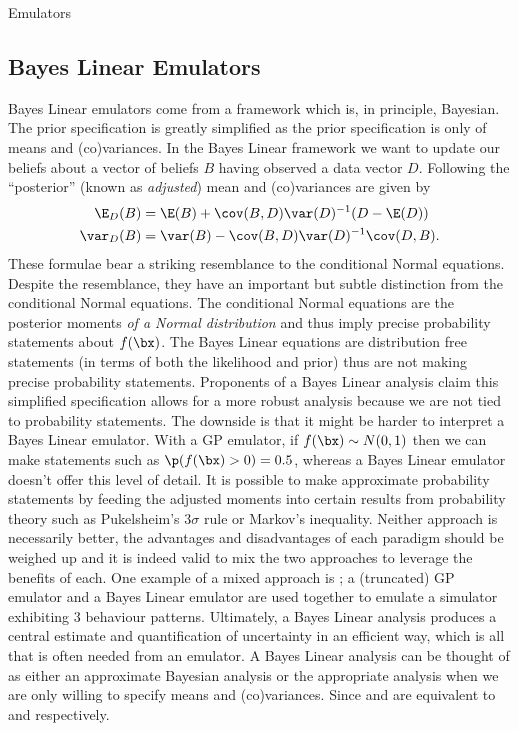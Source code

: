 \begin{chapter}{Emulators \label{Ch:Emulators}}
\subsection{Bayes Linear Emulators}
Bayes Linear emulators \citep{Jones2016, Wilson18, Bower2010, Vernon2019} come from a framework which is, in principle, Bayesian. The prior specification is greatly simplified as the prior specification is only of means and (co)variances. In the Bayes Linear framework we want to update our beliefs about a vector of beliefs $B$ having observed a data vector $D$. Following \citet{BLS07} the ``posterior'' (known as \textit{adjusted}) mean and (co)variances are given by
\begin{align}
  \E_{D}(B) &= \E(B) + \cov(B, D) \var(D)^{-1}(D - \E(D)) \label{Eq:bl-mean}\\
  \var_{D}(B) & = \var(B) - \cov(B, D) \var(D)^{-1} \cov(D, B) \label{Eq:bl-var}.
\end{align}
These formulae bear a striking resemblance to the conditional Normal equations. Despite the resemblance, they have an important but subtle distinction from the conditional Normal equations. The conditional Normal equations are the posterior moments \textit{of a Normal distribution} and thus imply precise probability statements about $f(\bx)$. The Bayes Linear equations are distribution free statements (in terms of both the likelihood and prior) thus are not making precise probability statements. Proponents of a Bayes Linear analysis claim this simplified specification allows for a more robust analysis because we are not tied to probability statements. The downside is that it might be harder to interpret a Bayes Linear emulator. With a GP emulator, if $f(\bx) \sim N(0, 1)$ then we can make statements such as $\p (f(\bx)>0) = 0.5$, whereas a Bayes Linear emulator doesn't offer this level of detail. It is possible to make approximate probability statements by feeding the adjusted moments into certain results from probability theory such as Pukelsheim's $3\sigma$ rule \citet{Pukelsheim1994} or Markov's inequality. Neither approach is necessarily better, the advantages and disadvantages of each paradigm should be weighed up and it is indeed valid to mix the two approaches to leverage the benefits of each. One example of a mixed approach is \citet{Owen2020}; a (truncated) GP emulator and a Bayes Linear emulator are used together to emulate a simulator exhibiting $3$ behaviour patterns.
Ultimately, a Bayes Linear analysis produces a central estimate and quantification of uncertainty in an efficient way, which is all that is often needed from an emulator. A Bayes Linear analysis can be thought of as either an approximate Bayesian analysis or the appropriate analysis when we are only willing to specify means and (co)variances. Since  and  are equivalent to  and  respectively.

\end{chapter}
